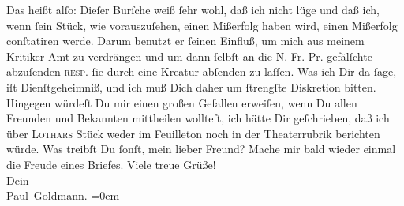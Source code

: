 \begin{ledgroupsized}[t]{13cm}
           \pstart
           {\pb}Das heißt alſo: Dieſer Burſche weiß ſehr wohl, daß ich nicht lüge
               und daß ich, wenn ſein Stück,
               wie vorauszuſehen, einen Mißerfolg haben wird, einen Mißerfolg conſtatiren werde.
               Darum benutzt er ſeinen Einfluß, um mich aus meinem Kritiker-Amt zu verdrängen und um
                  \introOben{}dann\introOben{} ſelbſt an die N. Fr.
                  Pr. gefälſchte \label{K_L02915-2v}\label{K_L02915-2h} abzuſenden \textsc{resp.} ſie durch eine Kreatur abſenden zu
               laſſen.\pend
           \pstart
           Was \strikeout{\textcolor{gray}{×}} ich Dir da ſage, iſt Dienſtgeheimniß, und ich muß Dich daher um ſtrengſte
               Diskretion bitten.\pend
           \pstart
           {\pb}Hingegen würdeſt Du mir einen großen Gefallen
               erweiſen, wenn Du allen Freunden und Bekannten mittheilen wollteſt, ich hätte Dir
               geſchrieben, daß ich über \textsc{Lothars}{ }Stück weder im Feuilleton noch in der Theaterrubrik berichten würde.\pend
           \pstart
           Was treibſt Du ſonſt, mein lieber Freund? Mache mir bald wieder einmal die Freude
               eines Briefes.\pend
           \pstart
           Viele treue Grüße! {\\[\baselineskip]}Dein {\\[\baselineskip]}\spacefill\mbox{Paul Goldmann.}\pend
           \leftskip=0em{}
         
         \endnumbering{}\end{ledgroupsized}  \newcommand{\dateiname}{L02915}\newcommand{\titel}{Paul Goldmann an Arthur Schnitzler, 10. 5. [1900]}\newcommand{\editorInnen}{Martin Anton Müller und Laura Untner}
      